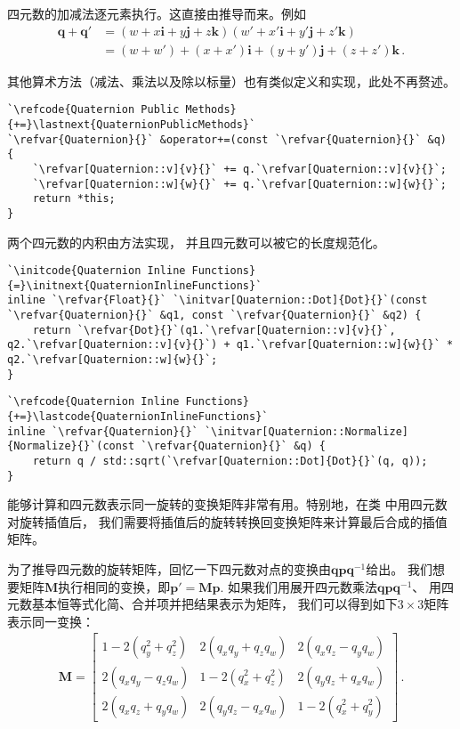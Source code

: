 四元数的加减法逐元素执行。这直接由推导而来。例如
\begin{align*}
    \bm q+\bm q' & =(w+x\mathbf{i}+y\mathbf{j}+z\mathbf{k})(w'+x'\mathbf{i}+y'\mathbf{j}+z'\mathbf{k})\nonumber \\
                 & =(w+w')+(x+x')\mathbf{i}+(y+y')\mathbf{j}+(z+z')\mathbf{k}\, .
\end{align*}

其他算术方法（减法、乘法以及除以标量）也有类似定义和实现，此处不再赘述。
\begin{lstlisting}
`\refcode{Quaternion Public Methods}{+=}\lastnext{QuaternionPublicMethods}`
`\refvar{Quaternion}{}` &operator+=(const `\refvar{Quaternion}{}` &q) {
    `\refvar[Quaternion::v]{v}{}` += q.`\refvar[Quaternion::v]{v}{}`;
    `\refvar[Quaternion::w]{w}{}` += q.`\refvar[Quaternion::w]{w}{}`;
    return *this;
}
\end{lstlisting}

两个四元数的内积由方法实现，
并且四元数可以被它的长度规范化。
\begin{lstlisting}
`\initcode{Quaternion Inline Functions}{=}\initnext{QuaternionInlineFunctions}`
inline `\refvar{Float}{}` `\initvar[Quaternion::Dot]{Dot}{}`(const `\refvar{Quaternion}{}` &q1, const `\refvar{Quaternion}{}` &q2) {
    return `\refvar{Dot}{}`(q1.`\refvar[Quaternion::v]{v}{}`, q2.`\refvar[Quaternion::v]{v}{}`) + q1.`\refvar[Quaternion::w]{w}{}` * q2.`\refvar[Quaternion::w]{w}{}`;
}
\end{lstlisting}

\begin{lstlisting}
`\refcode{Quaternion Inline Functions}{+=}\lastcode{QuaternionInlineFunctions}`
inline `\refvar{Quaternion}{}` `\initvar[Quaternion::Normalize]{Normalize}{}`(const `\refvar{Quaternion}{}` &q) {
    return q / std::sqrt(`\refvar[Quaternion::Dot]{Dot}{}`(q, q));
}
\end{lstlisting}

能够计算和四元数表示同一旋转的变换矩阵非常有用。特别地，在类
中用四元数对旋转插值后，
我们需要将插值后的旋转转换回变换矩阵来计算最后合成的插值矩阵。

为了推导四元数的旋转矩阵，回忆一下四元数对点的变换由$\bm q\bm p\bm q^{-1}$给出。
我们想要矩阵$\bm M$执行相同的变换，即$\bm p'=\bm M\bm p$.
如果我们用展开四元数乘法$\bm q\bm p\bm q^{-1}$、
用四元数基本恒等式化简、合并项并把结果表示为矩阵，
我们可以得到如下$3\times3$矩阵表示同一变换：
\begin{align}\label{eq:2.6}
    \bm M=\left[
        \begin{array}{ccc}
            1-2(q_y^2+q_z^2) & 2(q_xq_y+q_zq_w) & 2(q_xq_z-q_yq_w) \\
            2(q_xq_y-q_zq_w) & 1-2(q_x^2+q_z^2) & 2(q_yq_z+q_xq_w) \\
            2(q_xq_z+q_yq_w) & 2(q_yq_z-q_xq_w) & 1-2(q_x^2+q_y^2)
        \end{array}
        \right]\, .
\end{align}

